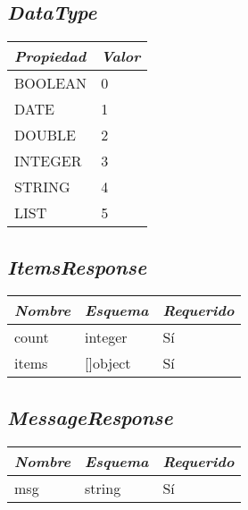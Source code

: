\subsection{\textit{DataType}}
\begin{table}[H]
    \centering
    \def\arraystretch{1.25}
    \begin{adjustbox}{max width=\textwidth}
    \begin{tabularx}{\textwidth}{|L|l|}
    \hline
        \textbf{\textit{Propiedad}} & \textbf{\textit{Valor}} \\ \hline
    \hline
        BOOLEAN & 0 \\ \hline
        DATE & 1 \\ \hline
        DOUBLE & 2 \\ \hline
        INTEGER & 3 \\ \hline
        STRING & 4 \\ \hline
        LIST & 5 \\ \hline
    \end{tabularx}
    \end{adjustbox}
\end{table}

\subsection{\textit{ItemsResponse}}
\begin{table}[H]
    \centering
    \def\arraystretch{1.25}
    \begin{adjustbox}{max width=\textwidth}
    \begin{tabularx}{\textwidth}{|L|l|l|}
    \hline
        \textbf{\textit{Nombre}} & \textbf{\textit{Esquema}} & \textbf{\textit{Requerido}} \\ \hline
    \hline
        count & integer & Sí \\ \hline
        items & []object & Sí \\ \hline
    \end{tabularx}
    \end{adjustbox}
\end{table}

\subsection{\textit{MessageResponse}}
\begin{table}[H]
    \centering
    \def\arraystretch{1.25}
    \begin{adjustbox}{max width=\textwidth}
    \begin{tabularx}{\textwidth}{|L|l|l|}
    \hline
        \textbf{\textit{Nombre}} & \textbf{\textit{Esquema}} & \textbf{\textit{Requerido}} \\ \hline
    \hline
    	msg & string & Sí \\ \hline
    \end{tabularx}
    \end{adjustbox}
\end{table}

